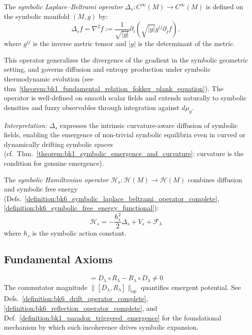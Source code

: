 \begin{definition}
\label{definition:bk6_symbolic_laplace_beltrami_operator_complete}
The \emph{symbolic Laplace–Beltrami operator} $\Delta_s : C^\infty(M) \to C^\infty(M)$ is defined on the symbolic manifold $(M, g)$ by:
\[
\Delta_s f = \nabla^2 f := \frac{1}{\sqrt{|g|}} \partial_i \left( \sqrt{|g|} g^{ij} \partial_j f \right),
\]
where $g^{ij}$ is the inverse metric tensor and $|g|$ is the determinant of the metric.

This operator generalizes the divergence of the gradient in the symbolic geometric setting, and governs diffusion and entropy production under symbolic thermodynamic evolution (see thm~\ref{theorem:bk1_fundamental_relation_fokker_plank_equation}). The operator is well-defined on smooth scalar fields and extends naturally to symbolic densities and fuzzy observables through integration against $d\mu_g$.

\emph{Interpretation:} $\Delta_s$ expresses the intrinsic curvature-aware diffusion of symbolic fields, enabling the emergence of non-trivial symbolic equilibria even in curved or dynamically drifting symbolic spaces (cf.~Thm.~\ref{theorem:bk1_symbolic_emergence_and_curvature}: curvature is the condition for genuine emergence).
\end{definition}

\begin{definition}
\label{definition:bk6_symbolic_hamiltonian_complete}
The \emph{symbolic Hamiltonian operator} $\mathcal{H}_s : \mathcal{H}(M) \to \mathcal{H}(M)$ combines diffusion and symbolic free energy (Defs.~\ref{definition:bk6_symbolic_laplace_beltrami_operator_complete}, \ref{definition:bk6_symbolic_free_energy_functional}):
\begin{equation}
\mathcal{H}_s = -\frac{\hbar_s^2}{2} \Delta_s + V_s + \mathcal{F}_\lambda
\end{equation}
where $\hbar_s$ is the symbolic action constant.
\end{definition}

\subsection{Fundamental Axioms}
\label{subsec:bk6_fundamental_axioms}

\begin{axiom}
\label{axiom:bk6_non_commutativity_evolution_reflection}
\begin{equation}
[D_\lambda, R_\lambda] = D_\lambda \circ R_\lambda - R_\lambda \circ D_\lambda \neq 0
\end{equation}
The commutator magnitude $\|[D_\lambda, R_\lambda]\|_{\text{op}}$ quantifies emergent potential.
See Defs.~\ref{definition:bk6_drift_operator_complete}, \ref{definition:bk6_reflection_operator_complete}, and Def.~\ref{definition:bk1_paradox_triggered_emergence} for the foundational mechanism by which such incoherence drives symbolic expansion.
\end{axiom}

